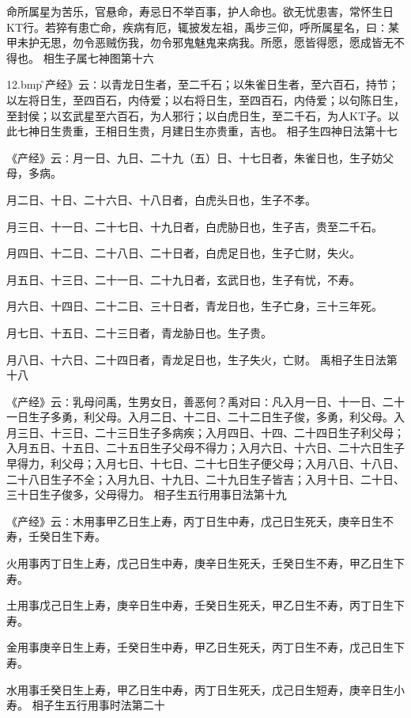 \documentclass[a4paper,12pt,UTF8,twoside]{ctexbook}
\begin{document}
命所属星为苦乐，官悬命，寿忌日不举百事，护人命也。欲无忧患害，常怀生日KT行。若猝有患亡命，疾病有厄，辄披发左祖，禹步三仰，呼所属星名，曰∶某甲未护无思，勿令恶贼伤我，勿令邪鬼魅鬼来病我。所愿，愿皆得愿，愿成皆无不得也。
相生子属七神图第十六

\pyxfc12.bmp\r《产经》云∶以青龙日生者，至二千石；以朱雀日生者，至六百石，持节；以左将日生，至四百石，内侍爱；以右将日生，至四百石，内侍爱；以句陈日生，至封侯；以玄武星至六百石，为人邪行；以白虎日生，至二千石，为人KT子。以此七神日生贵重，王相日生贵，月建日生亦贵重，吉也。
相子生四神日法第十七

《产经》云∶月一日、九日、二十九（五）日、十七日者，朱雀日也，生子妨父母，多病。

月二日、十日、二十六日、十八日者，白虎头日也，生子不孝。

月三日、十一日、二十七日、十九日者，白虎胁日也，生子吉，贵至二千石。

月四日、十二日、二十八日、二十日者，白虎足日也，生子亡财，失火。

月五日、十三日、二十一日、二十九日者，玄武日也，生子有忧，不寿。

月六日、十四日、二十二日、三十日者，青龙日也，生子亡身，三十三年死。

月七日、十五日、二十三日者，青龙胁日也。生子贵。

月八日、十六日、二十四日者，青龙足日也，生子失火，亡财。
禹相子生日法第十八

《产经》云∶乳母问禹，生男女日，善恶何？禹对曰∶凡入月一日、十一日、二十一日生子多勇，利父母。入月二日、十二日、二十二日生子俊，多勇，利父母。入月三日、十三日、二十三日生子多病疾；入月四日、十四、二十四日生子利父母；入月五日、十五日、二十五日生子父母不得力；入月六日、十六日、二十六日生子早得力，利父母；入月七日、十七日、二十七日生子便父母；入月八日、十八日、二十八日生子不全；入月九日、十九日、二十九日生子皆吉；入月十日、二十日、三十日生子俊多，父母得力。
相子生五行用事日法第十九

《产经》云∶木用事甲乙日生上寿，丙丁日生中寿，戊己日生死夭，庚辛日生不寿，壬癸日生下寿。

火用事丙丁日生上寿，戊己日生中寿，庚辛日生死夭，壬癸日生不寿，甲乙日生下寿。

土用事戊己日生上寿，庚辛日生中寿，壬癸日生死夭，甲乙日生不寿，丙丁日生下寿。

金用事庚辛日生上寿，壬癸日生中寿，甲乙日生死夭，丙丁日生不寿，戊己日生下寿。

水用事壬癸日生上寿，甲乙日生中寿，丙丁日生死夭，戊己日生短寿，庚辛日生小寿。
相子生五行用事时法第二十
\end{document}
